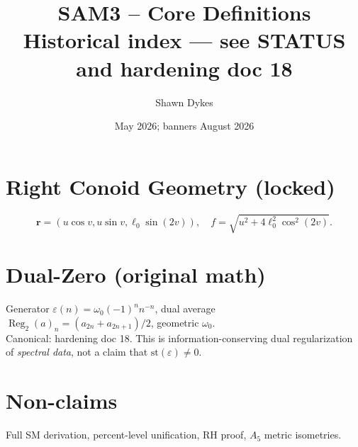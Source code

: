 \documentclass[11pt,a4paper]{article}
\title{\textbf{SAM3 -- Core Definitions}\\[0.3em]
\large Historical index — see STATUS and hardening doc 18}
\author{Shawn Dykes}
\date{May 2026; banners August 2026}
\begin{document}
\maketitle

\begin{center}
\end{center}

\section{Right Conoid Geometry (locked)}
\[
\mathbf{r}=(u\cos v,u\sin v,\ell_0\sin(2v)),\quad
f=\sqrt{u^2+4\ell_0^2\cos^2(2v)}.
\]

\section{Dual-Zero (original math)}
Generator $\varepsilon(n)=\omega_0(-1)^n n^{-n}$, dual average
$\operatorname{Reg}_2(a)_n=(a_{2n}+a_{2n+1})/2$, geometric $\omega_0$.\\
Canonical: hardening doc 18. This is information-conserving dual regularization of
\emph{spectral data}, not a claim that $\mathrm{st}(\varepsilon)\neq 0$.

\section{Non-claims}
Full SM derivation, percent-level unification, RH proof, $A_5$ metric isometries.
\end{document}
